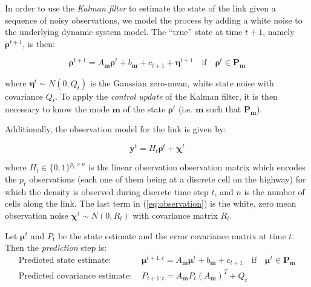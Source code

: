 In order to use the \textit{Kalman filter} to estimate the state of the link given a sequence of noisy observations, we model the process by adding a white noise to the underlying dynamic system model. The ``true'' state at time $t+1$, namely $\boldsymbol\rho^{t+1}$, is then:

\begin{equation}
\boldsymbol\rho^{t+1} = A_{\boldsymbol m} \boldsymbol\rho^{t} + b_{\boldsymbol m} + c_{t+1} + \boldsymbol\eta^{t+1} \quad\text{if}\quad\boldsymbol\rho^{t}\in\textbf{P}_{\boldsymbol m}
\label{eq:underlyingSystemDN3}
\end{equation}

\noindent where $\boldsymbol\eta^{t}\sim N(0,Q_{t})$ is the Gaussian zero-mean, white state noise with covariance $Q_{t}$. To apply the \textit{control update} of the Kalman filter, it is then necessary to know the mode $\boldsymbol m$ of the state $\boldsymbol\rho^{t}$ (i.e. $\boldsymbol m$ such that $\textbf{P}_{\boldsymbol m}$).

Additionally, the observation model for the link is given by:

\begin{equation}
\boldsymbol y^{t} = H_{t}\boldsymbol\rho^{t} + \boldsymbol\chi^{t}
\label{eq:observation}
\end{equation}

\noindent where $H_{t}\in \{ 0,1 \}^{p_{t}\times n}$ is the linear observation observation matrix which encodes the $p_{t}$ observations (each one of them being at a discrete cell on the highway) for which the density is observed during discrete time step $t$, and $n$ is the number of cells along the link. The last term in (\ref{eq:observation}) is the white, zero mean observation noise $\boldsymbol\chi^{t} \sim N(0,R_{t})$ with covariance matrix $R_{t}$.

\noindent Let $\boldsymbol\mu^{t}$ and $P_{t}$ be the state estimate and the error covariance matrix at time $t$. Then the \textit{prediction} step is:
\begin{equation}
\begin{array}{ll}
\text{Predicted state estimate: } & \boldsymbol\mu^{t+1:t} = A_{\boldsymbol m} \boldsymbol\mu^{t} + b_{\boldsymbol m} + c_{t+1}
\quad\text{if}\quad\boldsymbol\mu^{t}\in\textbf{P}_{\boldsymbol m}\\
\text{Predicted covariance estimate: } & P_{t+1:t} = A_{\boldsymbol m}P_{t}(A_{\boldsymbol m})^{T} + Q_{t}
\end{array}
\label{eq:predict}
\end{equation}

